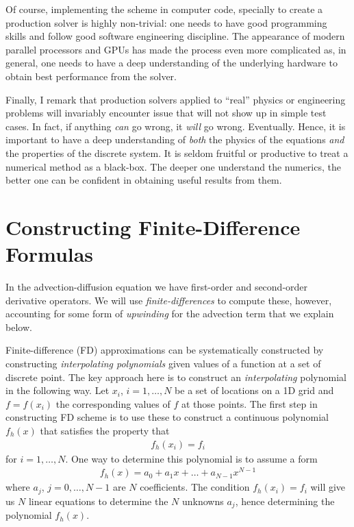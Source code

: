 \documentclass[12pt]{article}
\theoremstyle{definition}
\theoremstyle{definition}
\theoremstyle{definition}
\begin{document}
Of course, implementing the scheme in computer code, specially to
create a production solver is highly non-trivial: one needs to have
good programming skills and follow good software engineering
discipline. The appearance of modern parallel processors and GPUs has
made the process even more complicated as, in general, one needs to
have a deep understanding of the underlying hardware to obtain best
performance from the solver.

Finally, I remark that production solvers applied to ``real'' physics
or engineering problems will invariably encounter issue that will not
show up in simple test cases. In fact, if anything \emph{can} go
wrong, it \emph{will} go wrong. Eventually. Hence, it is important to
have a deep understanding of \emph{both} the physics of the equations
\emph{and} the properties of the discrete system. It is seldom
fruitful or productive to treat a numerical method as a black-box. The
deeper one understand the numerics, the better one can be confident in
obtaining useful results from them.

\section{Constructing Finite-Difference Formulas}

In the advection-diffusion equation we have first-order and
second-order derivative operators. We will use
\emph{finite-differences} to compute these, however, accounting for
some form of \emph{upwinding} for the advection term that we explain
below.

Finite-difference (FD) approximations can be systematically
constructed by constructing \emph{interpolating polynomials} given
values of a function at a set of discrete point. The key approach here
is to construct an \emph{interpolating} polynomial in the following
way. Let $x_i$, $i=1,\ldots,N$ be a set of locations on a 1D grid and
$f = f(x_i)$ the corresponding values of $f$ at those points. The
first step in constructing FD scheme is to use these to construct a
continuous polynomial $f_h(x)$ that satisfies the property that
\begin{align}
  f_h(x_i) = f_i
\end{align}
for $i=1,\ldots,N$. One way to determine this polynomial is to assume
a form
\begin{align}
  f_h(x) = a_0 + a_1 x + \ldots + a_{N-1} x^{N-1}
\end{align}
where $a_j$, $j = 0, \ldots, N-1$ are $N$ coefficients. The condition
$f_h(x_i) = f_i$ will give us $N$ linear equations to determine the
$N$ unknowns $a_j$, hence determining the polynomial $f_h(x)$.
\end{document}
